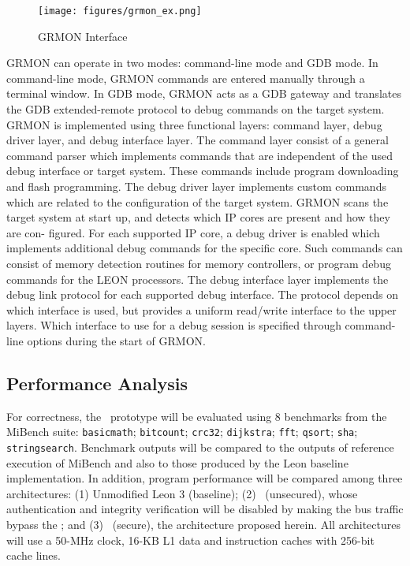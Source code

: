  \begin{figure}[ht]
    \centering
    \texttt{[image: figures/grmon\_ex.png]}
    \caption{GRMON  Interface }
    \label{fig:grmon_int}
\end{figure}
GRMON can operate in two modes: command-line mode and GDB mode. In command-line mode, GRMON
commands are entered manually through a terminal window. In GDB mode, GRMON acts as a GDB gateway
and translates the GDB extended-remote protocol to debug commands on the target system.
GRMON is implemented using three functional layers: command layer, debug driver layer, and debug interface
layer. The command layer consist of a general command parser which implements commands that are independent
of the used debug interface or target system. These commands include program downloading and flash
programming.
The debug driver layer implements custom commands which are related to the configuration of the target system. 
GRMON scans the target system at start up, and detects which IP cores are present and how they are con-
figured. For each supported IP core, a debug driver is enabled which implements additional debug commands
for the specific core. Such commands can consist of memory detection routines for memory controllers, or program
debug commands for the LEON processors.
The debug interface layer implements the debug link protocol for each supported debug interface. The protocol
depends on which interface is used, but provides a uniform read/write interface to the upper layers. Which
interface to use for a debug session is specified through command-line options during the start of GRMON.

  \subsection{ Performance Analysis}
  \label{subsec:performance}

  
  For correctness, the  \cshia~prototype will be  evaluated using 8 benchmarks from the MiBench suite: \texttt{basicmath}; \texttt{bitcount}; \texttt{crc32}; \texttt{dijkstra}; \texttt{fft}; \texttt{qsort}; \texttt{sha}; \texttt{stringsearch}. Benchmark outputs will be compared to the outputs of reference execution of MiBench and also to those produced by the Leon baseline implementation. In addition, program performance will be compared among three architectures: (1) Unmodified Leon 3 (baseline); (2) \cshia~(unsecured), whose authentication and integrity verification will be disabled by making the bus traffic bypass the \seccache; and (3) \cshia~(secure), the architecture proposed herein. All architectures will use a 50-MHz clock, 16-KB L1 data and instruction caches with 256-bit cache lines.

